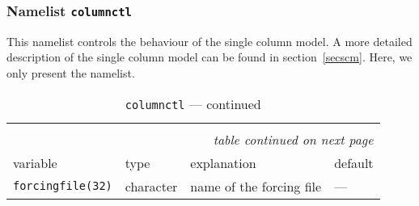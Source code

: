 \subsubsection{Namelist {\tt columnctl}}\label{seccolumnctl}

This namelist controls the behaviour of the single column model. A more
detailed description of the single column model can be found in
section~\ref{secscm}. Here, we only present the namelist.

\setlength{\LTcapwidth}{\textwidth}
\setlength{\LTleft}{0pt}\setlength{\LTright}{0pt}

\begin{longtable}{l@{\extracolsep\fill}lp{5.0cm}p{3.0cm}}
\hline\hline\caption[Namelist {\tt columnctl}]{Namelist
  {\tt columnctl}}\\\hline\label{tabcolumnctl}
\endfirsthead
\caption[]{{\tt columnctl} --- continued}\\\hline
\endhead
\hline\multicolumn{4}{r}{\slshape table continued on next page}\\
\endfoot
\hline %
\endlastfoot
variable & type & explanation & default \\\hline
{\tt forcingfile(32)}\index{namelist variables!forcingfile}
    &character       &name of the forcing file   &   ---   \\ 
 

\end{longtable}
